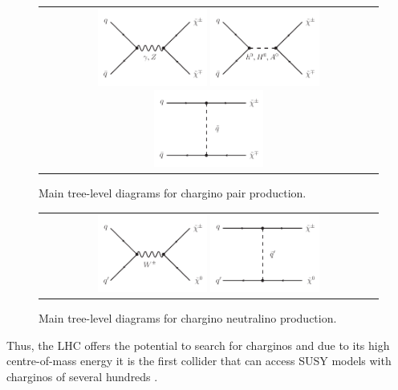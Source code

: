 \begin{figure}[!h]
  \centering 
  \begin{tabular}{c}
    \includegraphics[width=0.33\textwidth]{figures/analysis/ChiChi_GammaZ.pdf}
    \includegraphics[width=0.33\textwidth]{figures/analysis/ChiChi_Scalar.pdf}
    \includegraphics[width=0.33\textwidth]{figures/analysis/ChiChi_Squark.pdf}
  \end{tabular}
  \caption{Main tree-level diagrams for chargino pair production.}
   \vspace{30pt}
  \label{fig:FeynmanDiagramProductionCharginoPair}
\end{figure}

\begin{figure}[!h]
  \centering 
  \begin{tabular}{c}
    \includegraphics[width=0.33\textwidth]{figures/analysis/ChiChi0_WBoson.pdf}
    \includegraphics[width=0.33\textwidth]{figures/analysis/ChiChi0_Squark.pdf}
  \end{tabular}
  \caption{Main tree-level diagrams for chargino neutralino production.}
  \label{fig:FeynmanDiagramProductionCharginoNeutralino}
\end{figure}
Thus, the LHC offers the potential to search for charginos and due to its high centre-of-mass energy it is the first collider that can access SUSY models with charginos of several hundreds \gev.

